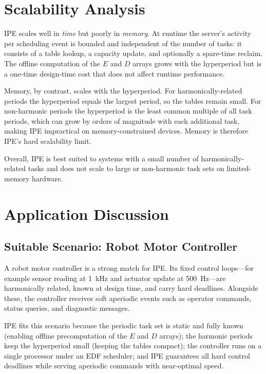 \documentclass[conference]{IEEEtran}
\begin{document}
\section{Scalability Analysis}
\label{sec:scalability}

IPE scales well in \emph{time} but poorly in \emph{memory}.
At runtime the server's activity per scheduling event is
bounded and independent of the number of tasks: it consists
of a table lookup, a capacity update, and optionally a
spare-time reclaim. The offline computation of the $E$ and
$D$ arrays grows with the hyperperiod but is a one-time
design-time cost that does not affect runtime performance.

Memory, by contrast, scales with the hyperperiod. For
harmonically-related periods the hyperperiod equals the
largest period, so the tables remain small. For non-harmonic
periods the hyperperiod is the least common multiple of all
task periods, which can grow by orders of magnitude with each
additional task, making IPE impractical on memory-constrained
devices. Memory is therefore IPE's hard scalability limit.

Overall, IPE is best suited to systems with a small number
of harmonically-related tasks and does not scale to large or
non-harmonic task sets on limited-memory hardware.

\section{Application Discussion}
\label{sec:applications}

\subsection{Suitable Scenario: Robot Motor Controller}

A robot motor controller is a strong match for IPE. Its fixed
control loops---for example sensor reading at 1~kHz and
actuator update at 500~Hz---are harmonically related, known at
design time, and carry hard deadlines. Alongside these, the
controller receives soft aperiodic events such as operator
commands, status queries, and diagnostic messages.

IPE fits this scenario because the periodic task set is
static and fully known (enabling offline precomputation of
the $E$ and $D$ arrays); the harmonic periods keep the
hyperperiod small (keeping the tables compact); the
controller runs on a single processor under an EDF scheduler;
and IPE guarantees all hard control deadlines while serving
aperiodic commands with near-optimal speed.
\end{document}
